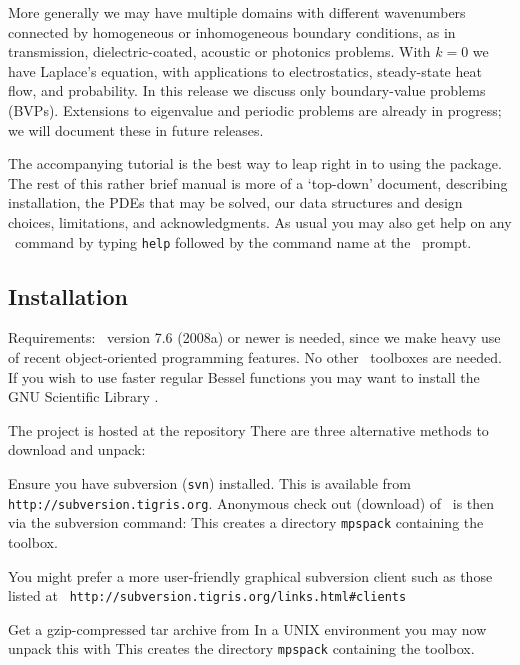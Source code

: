 \documentclass[12pt]{article}
\begin{document}
More generally we may have multiple domains with different
wavenumbers connected by homogeneous or inhomogeneous boundary conditions,
as in transmission, dielectric-coated, acoustic or photonics problems.
With $k=0$ we have Laplace's equation, with applications to
electrostatics, steady-state heat flow, and probability.
In this release we discuss only boundary-value problems (BVPs).
Extensions to eigenvalue and periodic problems are already in progress;
we will document these in future releases.

The accompanying tutorial is the best way to leap right in to using
the package.
The rest of this rather brief manual is more of a `top-down' document,
describing installation, the PDEs that may be solved,
our data structures and design choices, limitations, and acknowledgments.
As usual you
may also get help on any \mpspack\ command by typing {\tt help} followed
by the command name at the \matlab\ prompt.


\subsection{Installation}

Requirements: \matlab\ version 7.6 (2008a) or newer is needed,
since we make heavy use of recent object-oriented programming features.
No other \matlab\ toolboxes are needed.
If you wish to use faster regular Bessel functions you may want to
install the GNU Scientific Library \cite{GSL}.

The project is hosted at the repository
There are three alternative methods to download and unpack:
\ben
\item
Ensure you have subversion ({\tt svn}) installed.
This is available from {\tt http://subversion.tigris.org}.
Anonymous check out (download) of \mpspack\ is then via the subversion
command:
This creates a directory {\tt mpspack} containing the toolbox.

You might prefer a more user-friendly graphical
subversion client such as those listed at {\tt
http://subversion.tigris.org/links.html\#clients}

\item
Get a gzip-compressed tar archive from
In a UNIX environment you may now
unpack this with
This creates the directory {\tt mpspack} containing the toolbox.
\end{document}
